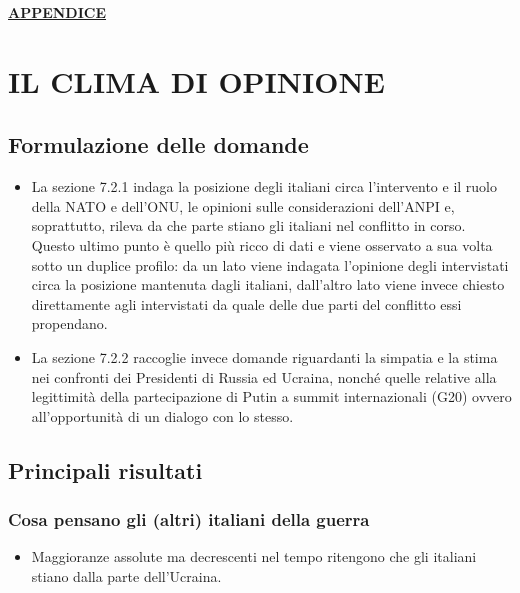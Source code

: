 \documentclass[
  openany]{book}
\providecommand{\tightlist}{%
  \setlength{\itemsep}{0pt}\setlength{\parskip}{0pt}}
\begin{document}
\href{https://github.com/LucianaFazio/Ucrania/blob/main/PDF_Appendice/VI.\%20Gli\%20effetti\%20del\%20conflitto\%20v.3.pdf}{\textbf{APPENDICE}}

\hypertarget{il-clima-di-opinione}{%
\chapter{IL CLIMA DI OPINIONE}\label{il-clima-di-opinione}}

\hypertarget{formulazione-delle-domande-5}{%
\section{Formulazione delle domande}\label{formulazione-delle-domande-5}}

\begin{itemize}
\item
  La sezione 7.2.1 indaga la posizione degli italiani circa l'intervento e il ruolo della NATO e dell'ONU, le opinioni sulle considerazioni dell'ANPI e, soprattutto, rileva da che parte stiano gli italiani nel conflitto in corso. Questo ultimo punto è quello più ricco di dati e viene osservato a sua volta sotto un duplice profilo: da un lato viene indagata l'opinione degli intervistati circa la posizione mantenuta dagli italiani, dall'altro lato viene invece chiesto direttamente agli intervistati da quale delle due parti del conflitto essi propendano.
\item
  La sezione 7.2.2 raccoglie invece domande riguardanti la simpatia e la stima nei confronti dei Presidenti di Russia ed Ucraina, nonché quelle relative alla legittimità della partecipazione di Putin a summit internazionali (G20) ovvero all'opportunità di un dialogo con lo stesso.
\end{itemize}

\hypertarget{principali-risultati-5}{%
\section{Principali risultati}\label{principali-risultati-5}}

\hypertarget{cosa-pensano-gli-altri-italiani-della-guerra}{%
\subsection{Cosa pensano gli (altri) italiani della guerra}\label{cosa-pensano-gli-altri-italiani-della-guerra}}

\begin{itemize}
\tightlist
\item
  Maggioranze assolute ma decrescenti nel tempo ritengono che gli italiani stiano dalla parte dell'Ucraina.
\end{itemize}
\end{document}
